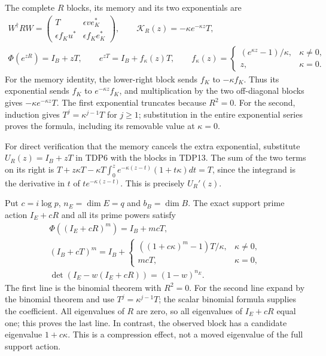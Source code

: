 \documentclass[11pt]{article}
\begin{document}
The complete $R$ blocks, its memory and its two exponentials are
\begin{equation}\tag{TDP13}
\begin{gathered}
W^\dagger RW=
\begin{pmatrix}T&\epsilon ve_K^*\\
 \epsilon f_Ku^*&\epsilon f_Ke_K^*\end{pmatrix},\qquad
\mathcal K_R(z)=-\kappa e^{-\kappa z}T,\\
\Phi(e^{zR})=I_B+zT,\qquad
e^{zT}=I_B+f_\kappa(z)T,\qquad
f_\kappa(z)=\begin{cases}(e^{\kappa z}-1)/\kappa,&\kappa\ne0,\\
z,&\kappa=0.
\end{cases}
\end{gathered}
\end{equation}
For the memory identity, the lower-right block sends $f_K$ to
$-\kappa f_K$. Thus its exponential sends $f_K$ to
$e^{-\kappa z}f_K$, and multiplication by the two off-diagonal blocks
gives $-\kappa e^{-\kappa z}T$. The first exponential truncates because
$R^2=0$. For the second, induction gives $T^j=\kappa^{j-1}T$ for $j\ge1$;
substitution in the entire exponential series proves the formula,
including its removable value at $\kappa=0$.

For direct verification that the memory cancels the extra exponential,
substitute $U_R(z)=I_B+zT$ in TDP6 with the blocks in TDP13. The sum of
the two terms on its right is
$T+z\kappa T-\kappa T\int_0^z e^{-\kappa(z-t)}(1+t\kappa)dt=T$,
since the integrand is the derivative in $t$ of
$t e^{-\kappa(z-t)}$. This is precisely $U_R'(z)$.

Put $c=i\log p$, $n_E=\dim E=q$ and $b_B=\dim B$. The exact support
prime action $I_E+cR$ and all its prime powers satisfy
\begin{equation}\tag{TDP14}
\begin{gathered}
\Phi((I_E+cR)^m)=I_B+mcT,\\
(I_B+cT)^m=I_B+
\begin{cases}((1+c\kappa)^m-1)T/\kappa,&\kappa\ne0,\\
mcT,&\kappa=0,
\end{cases}\\
\det(I_E-w(I_E+cR))=(1-w)^{n_E}.
\end{gathered}
\end{equation}
The first line is the binomial theorem with $R^2=0$. For the second line
expand by the binomial theorem and use $T^j=\kappa^{j-1}T$; the scalar
binomial formula supplies the coefficient. All eigenvalues of $R$ are
zero, so all eigenvalues of $I_E+cR$ equal one; this proves the last line.
In contrast, the observed block has a candidate eigenvalue
$1+c\kappa$. This is a compression effect, not a moved eigenvalue of
the full support action.
\end{document}
